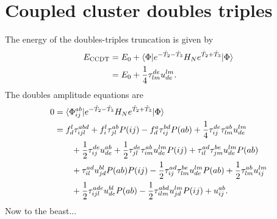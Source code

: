     \section{Coupled cluster doubles triples}
        The energy of the doubles-triples truncation is given by
        \begin{align}
            E_{\text{CCDT}}
            &= E_{0}
            + \langle \Phi | e^{-\hat{T}_2 - \hat{T}_3} H_N e^{\hat{T}_2 + \hat{T}_3}
            | \Phi \rangle
            \\
            &=
            E_0
            + \frac{1}{4} \tau^{de}_{lm} u^{lm}_{de}.
        \end{align}
        The doubles amplitude equations are
        \begin{align}
            0 & = \langle \Phi^{ab}_{ij} | e^{-\hat{T}_2 - \hat{T}_3} H_N
            e^{\hat{T}_2 + \hat{T}_3}| \Phi \rangle
            \\
            &=
            f^{l}_{d} \tau^{abd}_{ijl}
            + f^{l}_{i} \tau^{ab}_{jl} P(ij)
            - f^{a}_{d} \tau^{bd}_{ij} P(ab)
            + \frac{1}{4} \tau^{de}_{ij} \tau^{ab}_{lm} u^{lm}_{de}
            \nonumber \\
            &\qquad
            + \frac{1}{2} \tau^{de}_{ij} u^{ab}_{de}
            + \frac{1}{2} \tau^{de}_{jl} \tau^{ab}_{im} u^{lm}_{de} P(ij)
            + \tau^{ad}_{il} \tau^{be}_{jm} u^{lm}_{de} P(ab)
            \nonumber \\
            &\qquad
            + \tau^{ad}_{il} u^{bl}_{jd} P(ab) P(ij)
            - \frac{1}{2} \tau^{ad}_{ij} \tau^{be}_{lm} u^{lm}_{de} P(ab)
            + \frac{1}{2} \tau^{ab}_{lm} u^{lm}_{ij}
            \nonumber \\
            &\qquad
            + \frac{1}{2} \tau^{ade}_{ijl} u^{bl}_{de} P(ab)
            - \frac{1}{2} \tau^{abd}_{ilm} u^{lm}_{jd} P(ij)
            + u^{ab}_{ij}.
        \end{align}
        Now to the beast...

